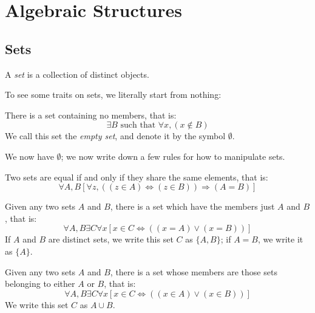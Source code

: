 \documentclass{report}
\begin{document}
	\section{Algebraic Structures}

		\subsection{Sets}

			\begin{defn}[Set] \label{def_set}
				A \emph{set} is a collection of distinct objects. 
			\end{defn}
		
			To see some traits on sets, we literally start from nothing:
			\begin{axiom} \label{axiom_empty_set}
				There is a set containing no members, that is:
				\begin{displaymath}
				\exists B \text{ such that } \forall x, (x \notin B)
				\end{displaymath}
				We call this set the \emph{empty set}, and denote it by the symbol $\emptyset$.
			\end{axiom}

			We now have $\emptyset$; we now write down a few rules for how to manipulate sets.
			\begin{axiom} \label{axiom_extensionality}
				Two sets are equal if and only if they share the same elements, that is:
				\begin{displaymath}
				\forall A,B [\forall z,((z \in A) \Leftrightarrow (z \in B)) \Rightarrow (A=B)]
				\end{displaymath}
			\end{axiom}

			\begin{axiom} \label{axiom_pairing}
				Given any two sets $A$ and $B$, there is a set which have the members just $A$ and $B$, that is:
				\begin{displaymath}
					\forall A,B \exists C \forall x [x \in C \Leftrightarrow ((x=A) \vee (x=B))]
				\end{displaymath}
				If $A$ and $B$ are distinct sets, we write this set $C$ as $\{A,B\}$; if $A=B$, we write it as $\{A\}$.
			\end{axiom}
	
			\begin{axiom} \label{axiom_union_simple}
				Given any two sets $A$ and $B$, there is a set whose members are those sets belonging to either $A$ or $B$, that is:
				\begin{displaymath}
					\forall A,B \exists C \forall x [x \in C \Leftrightarrow ((x \in A) \vee (x \in B))]
				\end{displaymath}
				We write this set $C$ as $A \cup B$.
			\end{axiom}
			
\end{document}
